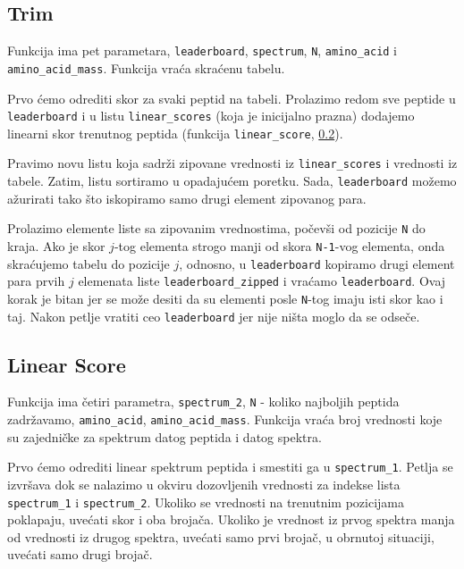 \newpage




\subsection{Trim}
\label{trim} 

Funkcija ima pet parametara, \texttt{leaderboard}, \texttt{spectrum}, \texttt{N}, \texttt{amino\_acid} i \texttt{amino\_acid\_mass}.  Funkcija vraća skraćenu tabelu.

Prvo ćemo odrediti skor za svaki peptid na tabeli. Prolazimo redom sve peptide u \texttt{leaderboard} i u listu \texttt{linear\_scores} (koja je inicijalno prazna) dodajemo linearni skor trenutnog peptida (funkcija \texttt{linear\_score}, \ref{scoreLinear}).

Pravimo novu listu koja sadrži zipovane vrednosti iz \texttt{linear\_scores} i vrednosti iz tabele. Zatim, listu sortiramo u opadajućem poretku. Sada, \texttt{leaderboard} možemo ažurirati tako što iskopiramo samo drugi element zipovanog para. 

Prolazimo elemente liste sa zipovanim vrednostima, počevši od pozicije \texttt{N} do kraja. Ako je skor $j$-tog elementa strogo manji od skora \texttt{N-1}-vog elementa, onda skraćujemo tabelu do pozicije $j$, odnosno, u \texttt{leaderboard} kopiramo drugi element para prvih $j$ elemenata liste \texttt{leaderboard\_zipped} i vraćamo \texttt{leaderboard}. Ovaj korak je bitan jer se može desiti da su elementi posle \texttt{N}-tog imaju isti skor kao i taj. Nakon petlje vratiti ceo \texttt{leaderboard} jer nije ništa moglo da se odseče.





\subsection{Linear Score}
\label{scoreLinear} 

Funkcija ima četiri parametra, \texttt{spectrum\_2}, \texttt{N} - koliko najboljih peptida zadržavamo, \texttt{amino\_acid},  \texttt{amino\_acid\_mass}. Funkcija vraća broj vrednosti koje su zajedničke za spektrum datog peptida i datog spektra.

Prvo ćemo odrediti linear spektrum peptida i smestiti ga u \texttt{spectrum\_1}. Petlja se izvršava dok se nalazimo u okviru dozovljenih vrednosti za indekse lista \texttt{spectrum\_1} i \texttt{spectrum\_2}. Ukoliko se vrednosti na trenutnim pozicijama poklapaju, uvećati skor i oba brojača. Ukoliko je vrednost iz prvog spektra manja od vrednosti iz drugog spektra, uvećati samo prvi brojač, u obrnutoj situaciji, uvećati samo drugi brojač.


